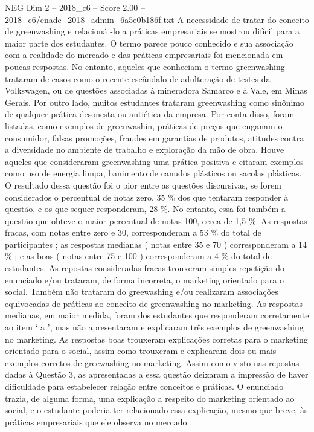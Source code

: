 \begin{textsample}{NEG Dim 2 – 2018\_c6 – Score 2.00 – 2018\_c6/enade\_2018\_admin\_6a5e0b186f.txt}
A necessidade de tratar do conceito de greenwashing e relacioná -lo a práticas empresariais se mostrou difícil para a maior parte dos estudantes.
O termo parece pouco conhecido e sua associação com a realidade do mercado e das práticas empresariais foi mencionada em poucas respostas.
No entanto, aqueles que conheciam o termo greenwashing trataram de casos como o recente escândalo de adulteração de testes da Volkswagen, ou de questões associadas à mineradora Samarco e à Vale, em Minas Gerais.
Por outro lado, muitos estudantes trataram greenwashing como sinônimo de qualquer prática desonesta ou antiética da empresa.
Por conta disso, foram listadas, como exemplos de greenwashin, práticas de preços que enganam o consumidor, falsas promoções, fraudes em garantias de produtos, atitudes contra a diversidade no ambiente de trabalho e exploração da mão de obra.
Houve aqueles que consideraram greenwashing uma prática positiva e citaram exemplos como uso de energia limpa, banimento de canudos plásticos ou sacolas plásticas.
O resultado dessa questão foi o pior entre as questões discursivas, se forem considerados o percentual de notas zero, 35 \% dos que tentaram responder à questão, e os que sequer responderam, 28 \%.
No entanto, essa foi também a questão que obteve o maior percentual de notas 100, cerca de 1,5 \%.
As respostas fracas, com notas entre zero e 30, corresponderam a 53 \% do total de participantes ; as respostas medianas ( notas entre 35 e 70 ) corresponderam a 14 \% ; e as boas ( notas entre 75 e 100 ) corresponderam a 4 \% do total de estudantes.
As repostas consideradas fracas trouxeram simples repetição do enunciado e/ou trataram, de forma incorreta, o marketing orientado para o social.
Também não trataram do greewashing e/ou realizaram associações equivocadas de práticas ao conceito de greenwashing no marketing.
As respostas medianas, em maior medida, foram dos estudantes que responderam corretamente ao item ‘ a ’, mas não apresentaram e explicaram três exemplos de greenwashing no marketing.
As respostas boas trouxeram explicações corretas para o marketing orientado para o social, assim como trouxeram e explicaram dois ou mais exemplos corretos de greewashing no marketing.
Assim como visto nas repostas dadas à Questão 3, as apresentadas a essa questão deixaram a impressão de haver dificuldade para estabelecer relação entre conceitos e práticas.
O enunciado trazia, de alguma forma, uma explicação a respeito do marketing orientado ao social, e o estudante poderia ter relacionado essa explicação, mesmo que breve, às práticas empresariais que ele observa no mercado.

\end{textsample}
